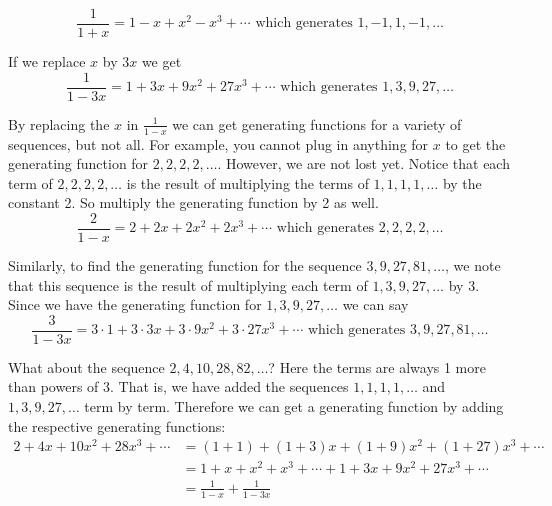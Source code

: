 \documentclass[10pt,]{book}
\theoremstyle{plain}
\theoremstyle{definition}
\theoremstyle{definition}
\theoremstyle{definition}
\theoremstyle{definition}
\numberwithin{equation}{chapter}
\newcommand{\amp}{&}
\begin{document}
\begin{equation*}
\frac{1}{1+x} = 1 - x + x^2 - x^3 + \cdots \mbox{ which generates }  1, -1, 1, -1, \ldots
\end{equation*}
%
\par
\hypertarget{p-1074}{}%
If we replace \(x\) by \(3x\) we get%
\begin{equation*}
\frac{1}{1-3x} = 1 + 3x + 9x^2 + 27x^3 + \cdots \mbox{ which generates }  1, 3, 9, 27, \ldots
\end{equation*}
%
\par
\hypertarget{p-1075}{}%
By replacing the \(x\) in \(\frac{1}{1-x}\) we can get generating functions for a variety of sequences, but not all. For example, you cannot plug in anything for \(x\) to get the generating function for \(2,2,2,2, \ldots\). However, we are not lost yet. Notice that each term of \(2, 2, 2, 2, \ldots\) is the result of multiplying the terms of \(1, 1, 1, 1, \ldots\) by the constant 2. So multiply the generating function by 2 as well.%
\begin{equation*}
\frac{2}{1-x} = 2 + 2x + 2x^2 + 2x^3 + \cdots \mbox{ which generates }  2, 2, 2, 2, \ldots
\end{equation*}
%
\par
\hypertarget{p-1076}{}%
Similarly, to find the generating function for the sequence \(3, 9, 27, 81, \ldots\), we note that this sequence is the result of multiplying each term of \(1, 3, 9, 27, \ldots\) by 3. Since we have the generating function for \(1, 3, 9, 27, \ldots\) we can say%
\begin{equation*}
\frac{3}{1-3x} = 3\cdot 1 + 3\cdot 3x + 3\cdot 9x^2 + 3\cdot 27x^3 + \cdots \mbox{ which generates }  3, 9, 27, 81, \ldots
\end{equation*}
%
\par
\hypertarget{p-1077}{}%
What about the sequence \(2, 4, 10, 28, 82, \ldots\)? Here the terms are always 1 more than powers of 3. That is, we have added the sequences \(1,1,1,1,\ldots\) and \(1,3,9, 27,\ldots\) term by term. Therefore we can get a generating function by adding the respective generating functions:%
\begin{align*}
2 + 4x + 10x^2 + 28x^3 + \cdots  \amp  = (1 + 1) + (1 + 3)x + (1 + 9)x^2 + (1 + 27)x^3 + \cdots\\
\amp  = 1 + x + x^2 + x^3 + \cdots + 1 + 3x + 9x^2 + 27x^3 + \cdots\\
\amp  = \frac{1}{1-x} + \frac{1}{1-3x}
\end{align*}
%
\par
\end{document}
